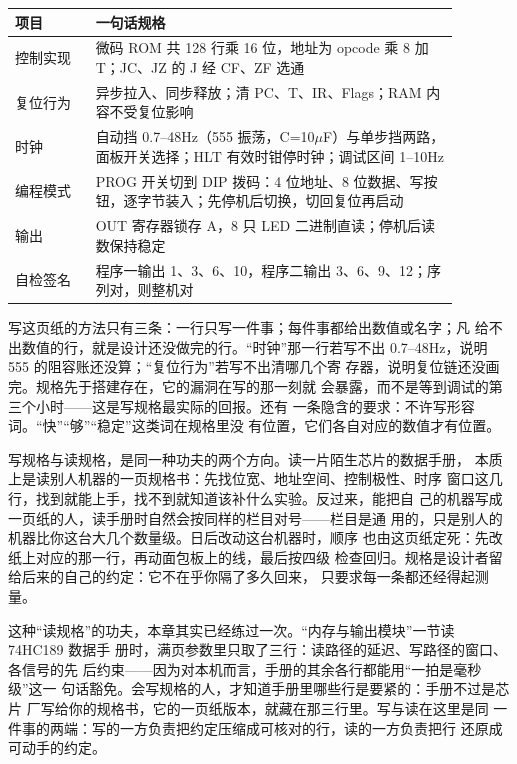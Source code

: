 \begin{longtable}{L{0.16\linewidth}L{0.72\linewidth}}
\toprule
项目 & 一句话规格 \\
\midrule
控制实现 & 微码 ROM 共 128 行乘 16 位，地址为 opcode 乘 8 加 T；JC、JZ 的 J 经 CF、ZF 选通 \\\tablerowrule
复位行为 & 异步拉入、同步释放；清 PC、T、IR、Flags；RAM 内容不受复位影响 \\\tablerowrule
时钟 & 自动挡 0.7--48Hz（555 振荡，C=10$\mu$F）与单步挡两路，面板开关选择；HLT 有效时钳停时钟；调试区间 1--10Hz \\\tablerowrule
编程模式 & PROG 开关切到 DIP 拨码：4 位地址、8 位数据、写按钮，逐字节装入；先停机后切换，切回复位再启动 \\\tablerowrule
输出 & OUT 寄存器锁存 A，8 只 LED 二进制直读；停机后读数保持稳定 \\\tablerowrule
自检签名 & 程序一输出 1、3、6、10，程序二输出 3、6、9、12；序列对，则整机对 \\
\bottomrule
\end{longtable}

写这页纸的方法只有三条：一行只写一件事；每件事都给出数值或名字；凡
给不出数值的行，就是设计还没做完的行。“时钟”那一行若写不出
0.7--48Hz，说明 555 的阻容账还没算；“复位行为”若写不出清哪几个寄
存器，说明复位链还没画完。规格先于搭建存在，它的漏洞在写的那一刻就
会暴露，而不是等到调试的第三个小时——这是写规格最实际的回报。还有
一条隐含的要求：不许写形容词。“快”“够”“稳定”这类词在规格里没
有位置，它们各自对应的数值才有位置。

写规格与读规格，是同一种功夫的两个方向。读一片陌生芯片的数据手册，
本质上是读别人机器的一页规格书：先找位宽、地址空间、控制极性、时序
窗口这几行，找到就能上手，找不到就知道该补什么实验。反过来，能把自
己的机器写成一页纸的人，读手册时自然会按同样的栏目对号——栏目是通
用的，只是别人的机器比你这台大几个数量级。日后改动这台机器时，顺序
也由这页纸定死：先改纸上对应的那一行，再动面包板上的线，最后按四级
检查回归。规格是设计者留给后来的自己的约定：它不在乎你隔了多久回来，
只要求每一条都还经得起测量。

这种“读规格”的功夫，本章其实已经练过一次。“内存与输出模块”一节读 74HC189 数据手
册时，满页参数里只取了三行：读路径的延迟、写路径的窗口、各信号的先
后约束——因为对本机而言，手册的其余各行都能用“一拍是毫秒级”这一
句话豁免。会写规格的人，才知道手册里哪些行是要紧的：手册不过是芯片
厂写给你的规格书，它的一页纸版本，就藏在那三行里。写与读在这里是同
一件事的两端：写的一方负责把约定压缩成可核对的行，读的一方负责把行
还原成可动手的约定。


